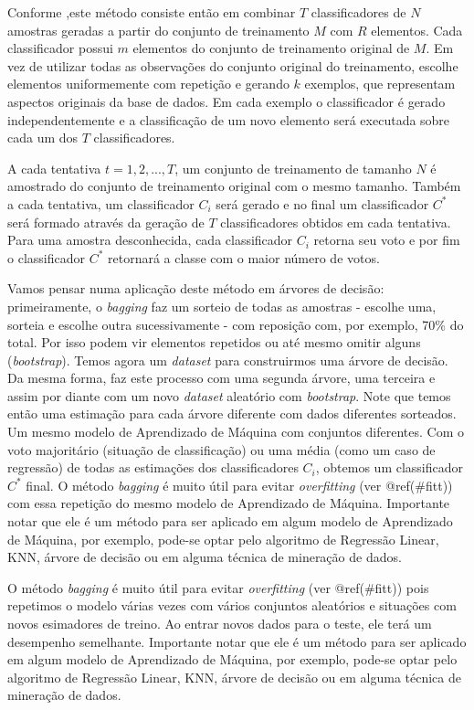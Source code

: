 \documentclass[
]{book}
\begin{document}
Conforme \citep{oshiro2013abordagem},este método consiste então em combinar \(T\) classificadores de \(N\) amostras geradas a partir do conjunto de treinamento \(M\) com \(R\) elementos. Cada classificador possui \(m\) elementos do conjunto de treinamento original de \(M\). Em vez de utilizar todas as observações do conjunto original do treinamento, escolhe elementos uniformemente com repetição e gerando \(k\) exemplos, que representam aspectos originais da base de dados. Em cada exemplo o classificador é gerado independentemente e a classificação de um novo elemento será executada sobre cada um dos \(T\) classificadores.

A cada tentativa \(t=1,2,...,T\), um conjunto de treinamento de tamanho \(N\) é amostrado do conjunto de treinamento original com o mesmo tamanho. Também a cada tentativa, um classificador \(C_i\) será gerado e no final um classificador \(C^*\) será formado através da geração de \(T\) classificadores obtidos em cada tentativa. Para uma amostra desconhecida, cada classificador \(C_i\) retorna seu voto e por fim o classificador \(C^*\) retornará a classe com o maior número de votos.

Vamos pensar numa aplicação deste método em árvores de decisão: primeiramente, o \emph{bagging} faz um sorteio de todas as amostras - escolhe uma, sorteia e escolhe outra sucessivamente - com reposição com, por exemplo, 70\% do total. Por isso podem vir elementos repetidos ou até mesmo omitir alguns (\emph{bootstrap}). Temos agora um \emph{dataset} para construirmos uma árvore de decisão. Da mesma forma, faz este processo com uma segunda árvore, uma terceira e assim por diante com um novo \emph{dataset} aleatório com \emph{bootstrap}. Note que temos então uma estimação para cada árvore diferente com dados diferentes sorteados. Um mesmo modelo de Aprendizado de Máquina com conjuntos diferentes. Com o voto majoritário (situação de classificação) ou uma média (como um caso de regressão) de todas as estimações dos classificadores \(C_i\), obtemos um classificador \(C^*\) final. O método \emph{bagging} é muito útil para evitar \emph{overfitting} (ver @ref(\#fitt)) com essa repetição do mesmo modelo de Aprendizado de Máquina. Importante notar que ele é um método para ser aplicado em algum modelo de Aprendizado de Máquina, por exemplo, pode-se optar pelo algoritmo de Regressão Linear, KNN, árvore de decisão ou em alguma técnica de mineração de dados.

O método \emph{bagging} é muito útil para evitar \emph{overfitting} (ver @ref(\#fitt)) pois repetimos o modelo várias vezes com vários conjuntos aleatórios e situações com novos esimadores de treino. Ao entrar novos dados para o teste, ele terá um desempenho semelhante. Importante notar que ele é um método para ser aplicado em algum modelo de Aprendizado de Máquina, por exemplo, pode-se optar pelo algoritmo de Regressão Linear, KNN, árvore de decisão ou em alguma técnica de mineração de dados.
\end{document}
